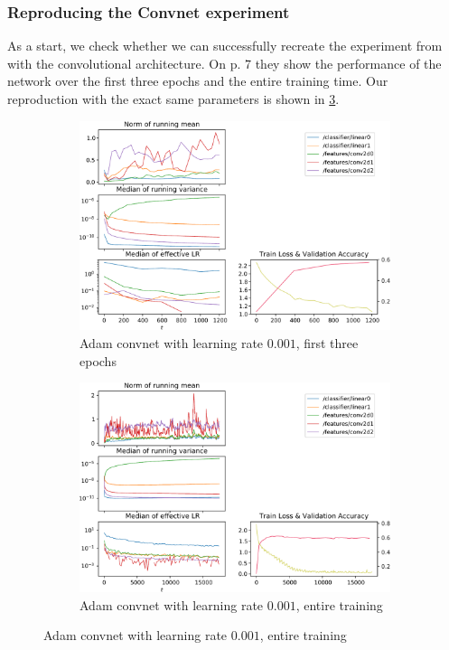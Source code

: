\subsubsection{Reproducing the Convnet experiment}

As a start, we check whether we can successfully recreate the experiment from
\citep{kingma2014adam} with the convolutional architecture. On p. 7 they show
the performance of the network over the first three epochs and the entire
training time. Our reproduction with the exact same parameters  is shown in
\cref{fig:adam-repro}.

\begin{figure}
    \begin{subfigure}{\textwidth}
        \centering
        \includegraphics[width=\linewidth]{gfx/diagrams/experiments/adam/adammodel_adam_0001_0_1200.pdf}
        \caption{Adam convnet with learning rate $0.001$, first three epochs}
        \label{fig:adam-repro-1}
    \end{subfigure}

    \begin{subfigure}{\textwidth}
        \centering
        \includegraphics[width=\linewidth]{gfx/diagrams/experiments/adam/adammodel_adam_0001_0_-1.pdf}
        \caption{Adam convnet with learning rate $0.001$, entire training}
        \label{fig:adam-repro-2}
    \end{subfigure}
    \label{fig:adam-repro}
\end{figure}

